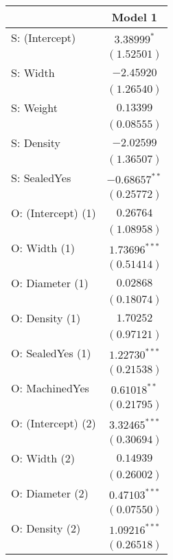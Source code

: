 
\begin{table}
\begin{center}
\begin{tabular}{l c}
\hline
 & Model 1 \\
\hline
S: (Intercept)     & $3.38999^{*}$   \\
                   & $(1.52501)$     \\
S: Width           & $-2.45920$      \\
                   & $(1.26540)$     \\
S: Weight          & $0.13399$       \\
                   & $(0.08555)$     \\
S: Density         & $-2.02599$      \\
                   & $(1.36507)$     \\
S: SealedYes       & $-0.68657^{**}$ \\
                   & $(0.25772)$     \\
O: (Intercept) (1) & $0.26764$       \\
                   & $(1.08958)$     \\
O: Width (1)       & $1.73696^{***}$ \\
                   & $(0.51414)$     \\
O: Diameter (1)    & $0.02868$       \\
                   & $(0.18074)$     \\
O: Density (1)     & $1.70252$       \\
                   & $(0.97121)$     \\
O: SealedYes (1)   & $1.22730^{***}$ \\
                   & $(0.21538)$     \\
O: MachinedYes     & $0.61018^{**}$  \\
                   & $(0.21795)$     \\
O: (Intercept) (2) & $3.32465^{***}$ \\
                   & $(0.30694)$     \\
O: Width (2)       & $0.14939$       \\
                   & $(0.26002)$     \\
O: Diameter (2)    & $0.47103^{***}$ \\
                   & $(0.07550)$     \\
O: Density (2)     & $1.09216^{***}$ \\
                   & $(0.26518)$     \\

\end{tabular}
\end{center}
\end{table}
